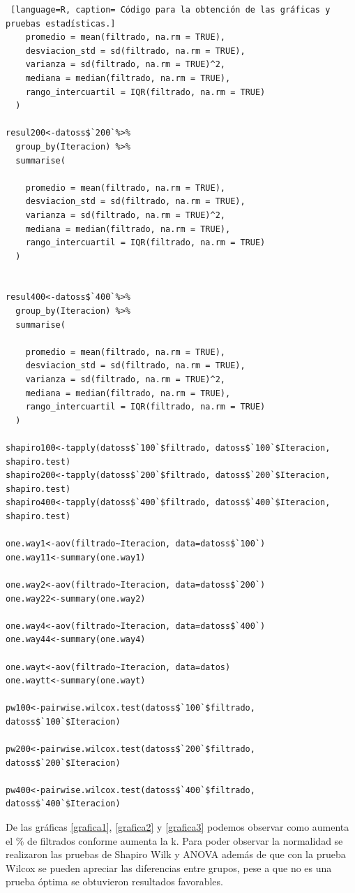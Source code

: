 \documentclass{article}
\begin{document}
\begin{lstlisting} [language=R, caption= Código para la obtención de las gráficas y pruebas estadísticas.]
    promedio = mean(filtrado, na.rm = TRUE),
    desviacion_std = sd(filtrado, na.rm = TRUE),
    varianza = sd(filtrado, na.rm = TRUE)^2,
    mediana = median(filtrado, na.rm = TRUE),
    rango_intercuartil = IQR(filtrado, na.rm = TRUE)
  )

resul200<-datoss$`200`%>%
  group_by(Iteracion) %>%
  summarise(
    
    promedio = mean(filtrado, na.rm = TRUE),
    desviacion_std = sd(filtrado, na.rm = TRUE),
    varianza = sd(filtrado, na.rm = TRUE)^2,
    mediana = median(filtrado, na.rm = TRUE),
    rango_intercuartil = IQR(filtrado, na.rm = TRUE)
  )


resul400<-datoss$`400`%>%
  group_by(Iteracion) %>%
  summarise(
    
    promedio = mean(filtrado, na.rm = TRUE),
    desviacion_std = sd(filtrado, na.rm = TRUE),
    varianza = sd(filtrado, na.rm = TRUE)^2,
    mediana = median(filtrado, na.rm = TRUE),
    rango_intercuartil = IQR(filtrado, na.rm = TRUE)
  )

shapiro100<-tapply(datoss$`100`$filtrado, datoss$`100`$Iteracion, shapiro.test)
shapiro200<-tapply(datoss$`200`$filtrado, datoss$`200`$Iteracion, shapiro.test)
shapiro400<-tapply(datoss$`400`$filtrado, datoss$`400`$Iteracion, shapiro.test)

one.way1<-aov(filtrado~Iteracion, data=datoss$`100`)
one.way11<-summary(one.way1)

one.way2<-aov(filtrado~Iteracion, data=datoss$`200`)
one.way22<-summary(one.way2)

one.way4<-aov(filtrado~Iteracion, data=datoss$`400`)
one.way44<-summary(one.way4)

one.wayt<-aov(filtrado~Iteracion, data=datos)
one.waytt<-summary(one.wayt)

pw100<-pairwise.wilcox.test(datoss$`100`$filtrado, datoss$`100`$Iteracion)

pw200<-pairwise.wilcox.test(datoss$`200`$filtrado, datoss$`200`$Iteracion)

pw400<-pairwise.wilcox.test(datoss$`400`$filtrado, datoss$`400`$Iteracion)

\end{lstlisting}

De las gráficas \ref{grafica1}, \ref{grafica2} y \ref{grafica3} podemos observar como aumenta el \% de filtrados conforme aumenta la k. Para poder observar la normalidad se realizaron las pruebas de Shapiro  Wilk \cite{shapiro} y ANOVA \cite{anova} además de que con la prueba Wilcox \cite{pairwise} se pueden apreciar las diferencias entre grupos, pese a que no es una prueba óptima se obtuvieron resultados favorables.
\end{document}

